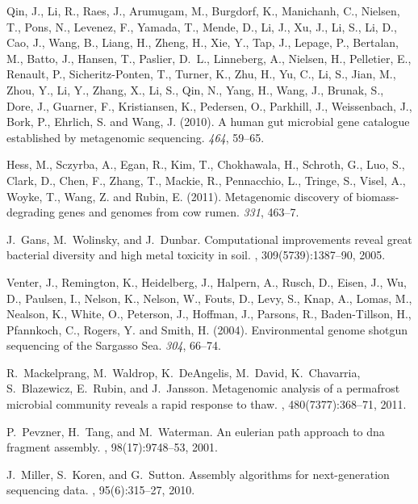 \documentclass{pnastwo}
\begin{document}
\begin{article}
\begin{thebibliography}{10}
Qin, J., Li, R., Raes, J., Arumugam, M., Burgdorf, K., Manichanh, C., Nielsen,
  T., Pons, N., Levenez, F., Yamada, T., Mende, D., Li, J., Xu, J., Li, S., Li,
  D., Cao, J., Wang, B., Liang, H., Zheng, H., Xie, Y., Tap, J., Lepage, P.,
  Bertalan, M., Batto, J., Hansen, T., Paslier, D.~L., Linneberg, A., Nielsen,
  H., Pelletier, E., Renault, P., Sicheritz-Ponten, T., Turner, K., Zhu, H.,
  Yu, C., Li, S., Jian, M., Zhou, Y., Li, Y., Zhang, X., Li, S., Qin, N., Yang,
  H., Wang, J., Brunak, S., Dore, J., Guarner, F., Kristiansen, K., Pedersen,
  O., Parkhill, J., Weissenbach, J., Bork, P., Ehrlich, S.  and Wang, J.
  (2010{\rm{}}).
\newblock A human gut microbial gene catalogue established by metagenomic
  sequencing.
 \emph{464}, 59--65.

Hess, M., Sczyrba, A., Egan, R., Kim, T., Chokhawala, H., Schroth, G., Luo, S.,
  Clark, D., Chen, F., Zhang, T., Mackie, R., Pennacchio, L., Tringe, S.,
  Visel, A., Woyke, T., Wang, Z.  and Rubin, E. (2011{\rm{}}).
\newblock Metagenomic discovery of biomass-degrading genes and genomes from cow
  rumen.
 \emph{331}, 463--7.

J.~Gans, M.~Wolinsky, and J.~Dunbar.
\newblock Computational improvements reveal great bacterial diversity and high
  metal toxicity in soil.
, 309(5739):1387--90, 2005.

Venter, J., Remington, K., Heidelberg, J., Halpern, A., Rusch, D., Eisen, J.,
  Wu, D., Paulsen, I., Nelson, K., Nelson, W., Fouts, D., Levy, S., Knap, A.,
  Lomas, M., Nealson, K., White, O., Peterson, J., Hoffman, J., Parsons, R.,
  Baden-Tillson, H., Pfannkoch, C., Rogers, Y.  and Smith, H. (2004{\rm{}}).
\newblock Environmental genome shotgun sequencing of the Sargasso Sea.
 \emph{304}, 66--74.

R.~Mackelprang, M.~Waldrop, K.~DeAngelis, M.~David, K.~Chavarria, S.~Blazewicz,
  E.~Rubin, and J.~Jansson.
\newblock Metagenomic analysis of a permafrost microbial community reveals a
  rapid response to thaw.
, 480(7377):368--71, 2011.

P.~Pevzner, H.~Tang, and M.~Waterman.
\newblock An eulerian path approach to dna fragment assembly.
, 98(17):9748--53, 2001.

J.~Miller, S.~Koren, and G.~Sutton.
\newblock Assembly algorithms for next-generation sequencing data.
, 95(6):315--27, 2010.


\end{thebibliography}
\end{article}
\end{document}
